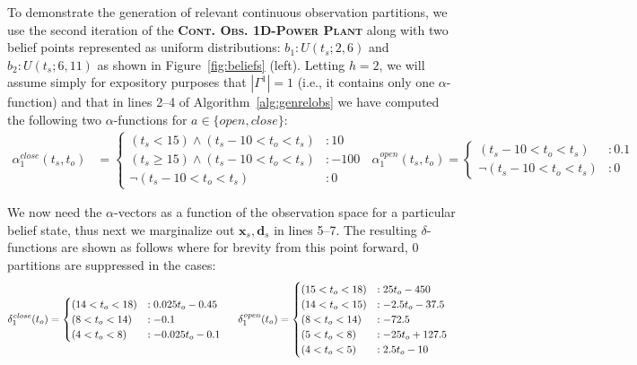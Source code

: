 \documentclass{article} %
\newcommand{\xds}{\mathbf{x}_s,\!\mathbf{d}_s}
\newcommand{\open}{\mathit{open}}
\newcommand{\close}{\mathit{close}}
\begin{document}
To demonstrate the generation of relevant continuous observation partitions, 
we use the second iteration of the \textsc{\bf Cont. Obs. 1D-Power
  Plant} along with two belief points represented as 
uniform distributions: $b_1: U(t_s;2,6)$ and $b_2: U(t_s;6,11)$ as
shown in Figure~\ref{fig:beliefs} (left).
Letting $h=2$, we will assume simply for expository purposes that 
$|\Gamma^{1}| = 1$ (i.e., it contains only one $\alpha$-function) and
that in lines 2--4 of Algorithm~\ref{alg:genrelobs} we have computed the 
following two $\alpha$-functions for $a \in \{ \open, \close \}$:
{\footnotesize
\vspace{-2mm}
\begin{align}
\alpha_1^{\close}(t_s,t_o) &= 
\begin{cases}
 (t_s<15)\wedge (t_s \! - \! 10 < t_o<t_s) &\!\!\!: 10 \\
(t_s\geq15)\wedge (t_s \! - \! 10 < t_o<t_s) &\!\!\!: -100  \\
\neg(t_s \! - \! 10 < t_o<t_s) &\!\!\! : 0
\end{cases}
\;\;
\alpha_1^{\open}(t_s,t_o) = \begin{cases}
(t_s \! - \! 10 < t_o<t_s) &\!\!\!: 0.1 \\
\neg(t_s \! - \! 10 < t_o<t_s) &\!\!\!: 0
\end{cases}
\nonumber
\end{align}
\vspace{-3mm}
} 

We now need the $\alpha$-vectors as a function of the observation
space for a particular belief state, thus next we marginalize out $\xds$
in lines 5--7. The resulting $\delta$-functions are shown as follows
where for brevity from this point forward, 0 partitions
are suppressed in the cases:
{\footnotesize
\vspace{-1mm}
\begin{align}
\delta^{\close}_1(t_o) &= 
\begin{cases}
 (14 < t_o< 18) &: 0.025 t_o - 0.45\\
 (8 < t_o< 14) &:  - 0.1\\
 (4 < t_o< 8) &: - 0.025 t_o -0.1\\
\end{cases}
\hspace{5mm} 
\delta^{\open}_1(t_o) = \begin{cases}
 (15 < t_o< 18) &: 25 t_o - 450\\
 (14 < t_o< 15) &: - 2.5 t_o - 37.5\\
 (8 < t_o< 14) &:  -72.5\\
 (5 < t_o< 8) &: - 25 t_o + 127.5\\
 (4 < t_o< 5) &:  2.5 t_o - 10\\
\end{cases}
\nonumber
\end{align}
\vspace{-4mm}
}
\end{document}
